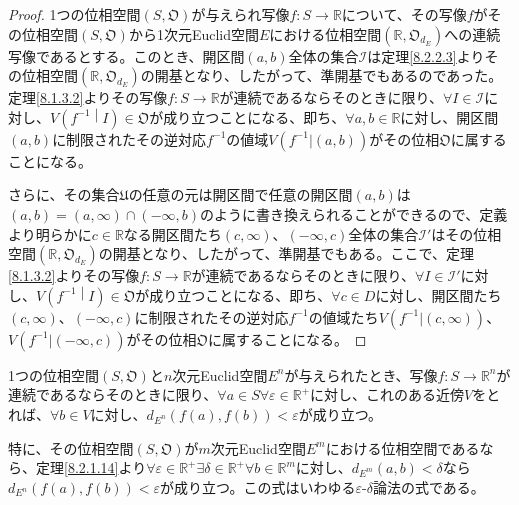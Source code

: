 \documentclass[dvipdfmx]{jsarticle}
\begin{document}
\begin{proof}
1つの位相空間$\left( S,\mathfrak{O} \right)$が与えられ写像$f:S \rightarrow \mathbb{R}$について、その写像$f$がその位相空間$\left( S,\mathfrak{O} \right)$から1次元Euclid空間$E$における位相空間$\left( \mathbb{R},\mathfrak{O}_{d_{E}} \right)$への連続写像であるとする。このとき、開区間$(a,b)$全体の集合$\mathcal{I}$は定理\ref{8.2.2.3}よりその位相空間$\left( \mathbb{R},\mathfrak{O}_{d_{E}} \right)$の開基となり、したがって、準開基でもあるのであった。定理\ref{8.1.3.2}よりその写像$f:S \rightarrow \mathbb{R}$が連続であるならそのときに限り、$\forall I\in \mathcal{I}$に対し、$V\left( f^{- 1} \middle| I \right)\in \mathfrak{O}$が成り立つことになる、即ち、$\forall a,b \in \mathbb{R}$に対し、開区間$(a,b)$に制限されたその逆対応$f^{- 1}$の値域$V\left( f^{- 1}|(a,b) \right)$がその位相$\mathfrak{O}$に属することになる。\par
さらに、その集合$\mathfrak{U}$の任意の元は開区間で任意の開区間$(a,b)$は$(a,b) = (a,\infty) \cap ( - \infty,b)$のように書き換えられることができるので、定義より明らかに$c \in \mathbb{R}$なる開区間たち$(c,\infty)$、$( - \infty,c)$全体の集合$\mathcal{I}'$はその位相空間$\left( \mathbb{R},\mathfrak{O}_{d_{E}} \right)$の開基となり、したがって、準開基でもある。ここで、定理\ref{8.1.3.2}よりその写像$f:S \rightarrow \mathbb{R}$が連続であるならそのときに限り、$\forall I \in \mathcal{I}'$に対し、$V\left( f^{- 1} \middle| I \right)\in \mathfrak{O}$が成り立つことになる、即ち、$\forall c \in D$に対し、開区間たち$(c,\infty)$、$( - \infty,c)$に制限されたその逆対応$f^{- 1}$の値域たち$V\left( f^{- 1}|(c,\infty) \right)$、$V\left( f^{- 1}|( - \infty,c) \right)$がその位相$\mathfrak{O}$に属することになる。
\end{proof}
\begin{thm}\label{8.2.2.7}
1つの位相空間$\left( S,\mathfrak{O} \right)$と$n$次元Euclid空間$E^{n}$が与えられたとき、写像$f:S \rightarrow \mathbb{R}^{n}$が連続であるならそのときに限り、$\forall a \in S\forall\varepsilon \in \mathbb{R}^{+}$に対し、これのある近傍$V$をとれば、$\forall b \in V$に対し、$d_{E^{n}}\left( f(a),f(b) \right) < \varepsilon$が成り立つ。
\end{thm}\par
特に、その位相空間$\left( S,\mathfrak{O} \right)$が$m$次元Euclid空間$E^{m}$における位相空間であるなら、定理\ref{8.2.1.14}より$\forall\varepsilon \in \mathbb{R}^{+}\exists\delta \in \mathbb{R}^{+}\forall b \in \mathbb{R}^{m}$に対し、$d_{E^{m}}(a,b) < \delta$なら$d_{E^{n}}\left( f(a),f(b) \right) < \varepsilon$が成り立つ。この式はいわゆる$\varepsilon $-$\delta $論法の式である。
\end{document}
